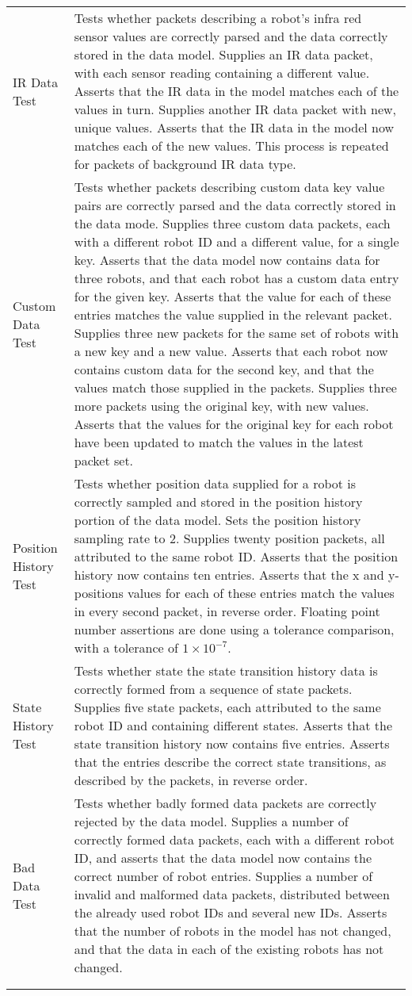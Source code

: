 \begin{longtable}{ l p{10cm} }
 IR Data Test & Tests whether packets describing a robot's infra red sensor values are correctly parsed and the data correctly stored in the data model. Supplies an IR data packet, with each sensor reading containing a different value. Asserts that the IR data in the model matches each of the values in turn. Supplies another IR data packet with new, unique values. Asserts that the IR data in the model now matches each of the new values. This process is repeated for packets of background IR data type.\\
 Custom Data Test & Tests whether packets describing custom data key value pairs are correctly parsed and the data correctly stored in the data mode. Supplies three custom data packets, each with a different robot ID and a different value, for a single key. Asserts that the data model now contains data for three robots, and that each robot has a custom data entry for the given key. Asserts that the value for each of these entries matches the value supplied in the relevant packet. Supplies three new packets for the same set of robots with a new key and a new value. Asserts that each robot now contains custom data for the second key, and that the values match those supplied in the packets. Supplies three more packets using the original key, with new values. Asserts that the values for the original key for each robot have been updated to match the values in the latest packet set.\\
 Position History Test & Tests whether position data supplied for a robot is correctly sampled and stored in the position history portion of the data model. Sets the position history sampling rate to 2. Supplies twenty position packets, all attributed to the same robot ID. Asserts that the position history now contains ten entries. Asserts that the x and y-positions values for each of these entries match the values in every second packet, in reverse order. Floating point number assertions are done using a tolerance comparison, with a tolerance of $ 1 \times 10^{-7} $.\\
 State History Test & Tests whether state the state transition history data is correctly formed from a sequence of state packets. Supplies five state packets, each attributed to the same robot ID and containing different states. Asserts that the state transition history now contains five entries. Asserts that the entries describe the correct state transitions, as described by the packets, in reverse order.\\
 Bad Data Test & Tests whether badly formed data packets are correctly rejected by the data model. Supplies a number of correctly formed data packets, each with a different robot ID, and asserts that the data model now contains the correct number of robot entries. Supplies a number of invalid and malformed data packets, distributed between the already used robot IDs and several new IDs. Asserts that the number of robots in the model has not changed, and that the data in each of the existing robots has not changed.\\
 \bottomrule\\
	
 \label{tab:DataModelTestCases}
\end{longtable}

